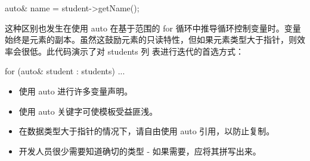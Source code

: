 \begin{cpp}
auto& name = student->getName();
\end{cpp}

这种区别也发生在使用 auto 在基于范围的 for 循环中推导循环控制变量时。变量始终是元素的副本。虽然这鼓励元素的只读特性，但如果元素类型大于指针，则效率会很低。此代码演示了对 students 列 表进行迭代的首选方式：

\begin{cpp}
for (auto& student : students) ...
\end{cpp}


\begin{itemize}
\item
使用 auto 进行许多变量声明。

\item
使用 auto 关键字可使模板受益匪浅。

\item
在数据类型大于指针的情况下，请自由使用 auto 引用，以防止复制。

\item
开发人员很少需要知道确切的类型 - 如果需要，应将其拼写出来。
\end{itemize}
